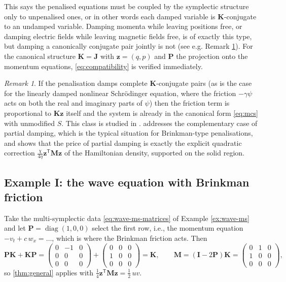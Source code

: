 \documentclass[11pt]{article}
\theoremstyle{definition}
\theoremstyle{remark}
\newtheorem{remark}[theorem]{Remark}
\newcommand{\bz}{\bm{z}}
\newcommand{\bK}{\bm{K}}
\newcommand{\bJ}{\bm{J}}
\newcommand{\bP}{\bm{P}}
\newcommand{\bM}{\bm{M}}
\newcommand{\bI}{\bm{I}}
\DeclareMathOperator{\diag}{diag}
\begin{document}
This says the penalised equations must be coupled by the
symplectic structure only to unpenalised ones, or in other words each damped variable is $\bK$-conjugate to an undamped variable.  Damping momenta while
leaving positions free, or damping electric fields while leaving
magnetic fields free, is of exactly this type, but damping a canonically
conjugate pair jointly is not (see e.g. Remark \ref{rem:nls}).  For the canonical
structure $\bK=\bJ$ with $\bz=(q,p)$ and $\bP$ the projection onto the
momentum equations, \eqref{eq:compatibility} is verified immediately.

\begin{remark}
\label{rem:nls}
If the penalisation damps complete $\bK$-conjugate pairs (as is the case for the linearly damped nonlinear Schr\"odinger equation, where the friction $-\gamma\psi$ acts on both the real and imaginary parts of $\psi$) then the friction term is proportional to $\bK\bz$ itself and
the system is already in the canonical form \eqref{eq:mcs} with
unmodified $S$. This class is studied in
\cite{moore2013conformal}.   addresses the
complementary case of partial damping, which is the typical
situation for Brinkman-type penalisations, and shows that the price of
partial damping is exactly the explicit quadratic correction
$\frac{\chi}{4\eta}\bz^{\mathsf T}\bM\bz$ of the Hamiltonian density,
supported on the solid region.
\end{remark}

\subsection{Example I: the wave equation with Brinkman friction}
\label{subsec:wave}

Take the multi-symplectic data \eqref{eq:wave-ms-matrices} of
Example \ref{ex:wave-ms} and let $\bP=\diag(1,0,0)$ select the first row,
i.e., the momentum equation $-v_t+c\,w_x=\dots$, which is where the
Brinkman friction acts.  Then
\[
\bP\bK+\bK\bP
= \begin{pmatrix}0&-1&0\\0&0&0\\0&0&0\end{pmatrix}
+ \begin{pmatrix}0&0&0\\1&0&0\\0&0&0\end{pmatrix}
= \bK ,
\qquad
\bM=(\bI-2\bP)\bK
= \begin{pmatrix}0&1&0\\1&0&0\\0&0&0\end{pmatrix},
\]
so \cref{thm:general} applies with
$\tfrac14\bz^{\mathsf T}\bM\bz=\tfrac12\,uv$.
\end{document}
